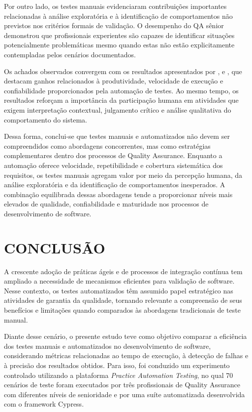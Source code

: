 \documentclass{UNESC}
\begin{document}
Por outro lado, os testes manuais evidenciaram contribuições importantes relacionadas à análise exploratória e à identificação de comportamentos não previstos nos critérios formais de validação. O desempenho do QA sênior demonstrou que profissionais experientes são capazes de identificar situações potencialmente problemáticas mesmo quando estas não estão explicitamente contempladas pelos cenários documentados.

Os achados observados convergem com os resultados apresentados por ,  e , que destacam ganhos relacionados à produtividade, velocidade de execução e confiabilidade proporcionados pela automação de testes. Ao mesmo tempo, os resultados reforçam a importância da participação humana em atividades que exigem interpretação contextual, julgamento crítico e análise qualitativa do comportamento do sistema.

Dessa forma, conclui-se que testes manuais e automatizados não devem ser compreendidos como abordagens concorrentes, mas como estratégias complementares dentro dos processos de Quality Assurance. Enquanto a automação oferece velocidade, repetibilidade e cobertura sistemática dos requisitos, os testes manuais agregam valor por meio da percepção humana, da análise exploratória e da identificação de comportamentos inesperados. A combinação equilibrada dessas abordagens tende a proporcionar níveis mais elevados de qualidade, confiabilidade e maturidade nos processos de desenvolvimento de software.

\section{CONCLUSÃO}
A crescente adoção de práticas ágeis e de processos de integração contínua tem ampliado a necessidade de mecanismos eficientes para validação de software. Nesse contexto, os testes automatizados têm assumido papel estratégico nas atividades de garantia da qualidade, tornando relevante a compreensão de seus benefícios e limitações quando comparados às abordagens tradicionais de teste manual.

Diante desse cenário, o presente estudo teve como objetivo comparar a eficiência dos testes manuais e automatizados no desenvolvimento de software, considerando métricas relacionadas ao tempo de execução, à detecção de falhas e à precisão dos resultados obtidos. Para isso, foi conduzido um experimento controlado utilizando a plataforma \textit{Practice Automation Testing}, no qual 70 cenários de teste foram executados por três profissionais de Quality Assurance com diferentes níveis de senioridade e por uma suíte automatizada desenvolvida com o framework Cypress.
\end{document}
